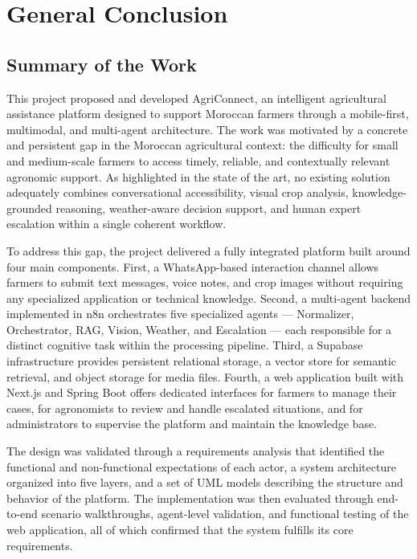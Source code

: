\chapter*{General Conclusion}

\section{Summary of the Work}

This project proposed and developed AgriConnect, an intelligent agricultural assistance platform designed to support Moroccan farmers through a mobile-first, multimodal, and multi-agent architecture. The work was motivated by a concrete and persistent gap in the Moroccan agricultural context: the difficulty for small and medium-scale farmers to access timely, reliable, and contextually relevant agronomic support. As highlighted in the state of the art, no existing solution adequately combines conversational accessibility, visual crop analysis, knowledge-grounded reasoning, weather-aware decision support, and human expert escalation within a single coherent workflow.

To address this gap, the project delivered a fully integrated platform built around four main components. First, a WhatsApp-based interaction channel allows farmers to submit text messages, voice notes, and crop images without requiring any specialized application or technical knowledge. Second, a multi-agent backend implemented in n8n orchestrates five specialized agents — Normalizer, Orchestrator, RAG, Vision, Weather, and Escalation — each responsible for a distinct cognitive task within the processing pipeline. Third, a Supabase infrastructure provides persistent relational storage, a vector store for semantic retrieval, and object storage for media files. Fourth, a web application built with Next.js and Spring Boot offers dedicated interfaces for farmers to manage their cases, for agronomists to review and handle escalated situations, and for administrators to supervise the platform and maintain the knowledge base.

The design was validated through a requirements analysis that identified the functional and non-functional expectations of each actor, a system architecture organized into five layers, and a set of UML models describing the structure and behavior of the platform. The implementation was then evaluated through end-to-end scenario walkthroughs, agent-level validation, and functional testing of the web application, all of which confirmed that the system fulfills its core requirements.

